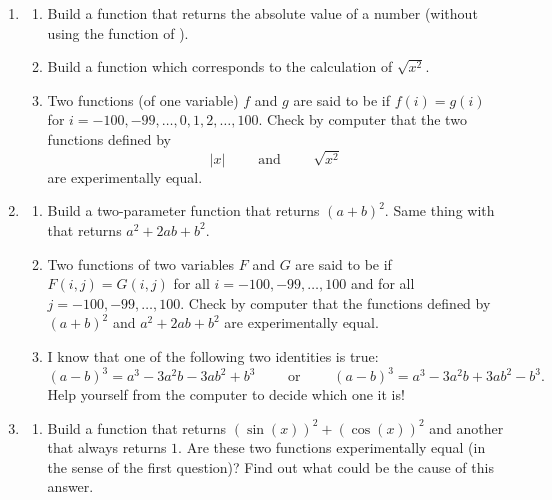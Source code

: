 \documentclass[11pt,class=report,crop=false]{standalone}
\begin{document}
\begin{activite}


\begin{enumerate}
  \item
  \begin{enumerate}
    \item Build a function  that returns the absolute value of a number (without using the function  of \Python{}).

    \item Build a function  which corresponds to the calculation of $\sqrt{x^2}$.

  
  \item Two functions (of one variable) $f$ and $g$ are said to be  if $f(i)=g(i)$ for $i=-100,-99,\ldots,0,1,2,\ldots,100$. Check by computer that the two functions defined by
  $$|x| \qquad \text{ and } \qquad \sqrt{x^2}$$
  are experimentally equal. 
  
  \end{enumerate}
  
  \item
    \begin{enumerate}
    \item Build a two-parameter function  that returns $(a+b)^2$. Same thing with  that returns $a^2+2ab+b^2$.
 
  \item Two functions of two variables $F$ and $G$ are said to be  if $F(i,j)=G(i,j)$ for all $i=-100,-99,\ldots,100$ and for all $j = -100,-99,\ldots,100$. Check by computer that the functions defined by $(a+b)^2$ and $a^2+2ab+b^2$ are experimentally equal. 
  
   \item I know that one of the following two identities is true:
   $$(a-b)^3 = a^3 - 3a^2b -3ab^2+b^3 \qquad \text{ or } \qquad (a-b)^3 = a^3 - 3a^2b  + 3ab^2 - b^3.$$
   Help yourself from the computer to decide which one it is!
   
  \end{enumerate} 
  
  \item 
   \begin{enumerate}
    \item Build a function  that returns $(\sin(x))^2 + (\cos(x))^2$ and another  that always returns $1$. Are these two functions experimentally equal (in the sense of the first question)? Find out what could be the cause of this answer.
    

\end{enumerate}
\end{enumerate}
\end{activite}
\end{document}
